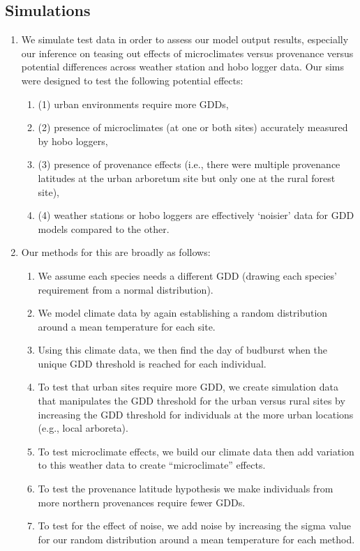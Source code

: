 \documentclass{article}\usepackage[]{graphicx}\usepackage[]{color}
\begin{document}
\subsection*{Simulations}
\begin{enumerate}
\item We simulate test data in order to assess our model output results, especially our inference on teasing out effects of microclimates versus provenance versus potential differences across weather station and hobo logger data. Our sims were designed to test the following potential effects:
  \begin{enumerate}
  \item (1) urban environments require more GDDs,
  \item (2) presence of microclimates (at one or both sites) accurately measured by hobo loggers,
  \item (3) presence of provenance effects (i.e., there were multiple provenance latitudes at the urban arboretum site but only one at the rural forest site),
  \item (4) weather stations or hobo loggers are effectively `noisier' data for GDD models compared to the other. 
  \end{enumerate}

\item Our methods for this are broadly as follows:
  \begin{enumerate}
  \item We assume each species needs a different GDD (drawing each species' requirement from a normal distribution).
  \item We model climate data by again establishing a random distribution around a mean temperature for each site. 
 \item Using this climate data, we then find the day of budburst when the unique GDD threshold is reached for each individual. 
  \item To test that urban sites require more GDD, we create simulation data that manipulates the GDD threshold for the urban versus rural sites by increasing the GDD threshold for individuals at the more urban locations (e.g., local arboreta). 
  \item  To test microclimate effects, we build our climate data then add variation to this weather data to create ``microclimate'' effects. 
  \item To test the provenance latitude hypothesis we make individuals from more northern provenances require fewer GDDs.
  \item To test for the effect of noise, we add noise by increasing the sigma value for our random distribution around a mean temperature for each method.
  \end{enumerate}


\end{enumerate}
\end{document}
